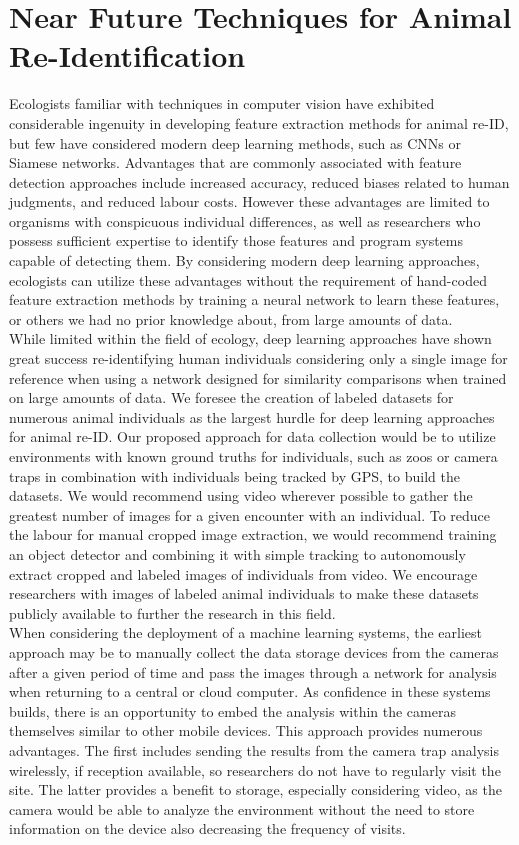 \documentclass[11pt]{article}
\begin{document}
\section*{Near Future Techniques for Animal Re-Identification}
Ecologists familiar with techniques in computer vision have exhibited considerable ingenuity in developing feature extraction methods for animal re-ID, but few have considered modern deep learning methods, such as CNNs or Siamese networks. Advantages that are commonly associated with feature detection approaches include increased accuracy, reduced biases related to human judgments, and reduced labour costs. However these advantages are limited to organisms with conspicuous individual differences, as well as researchers who possess sufficient expertise to identify those features and program systems capable of detecting them. By considering modern deep learning approaches, ecologists can utilize these advantages without the requirement of hand-coded feature extraction methods by training a neural network to learn these features, or others we had no prior knowledge about, from large amounts of data. 
\newline
\\
While limited within the field of ecology, deep learning approaches have shown great success re-identifying human individuals considering only a single image for reference when using a network designed for similarity comparisons when trained on large amounts of data. We foresee the creation of labeled datasets for numerous animal individuals as the largest hurdle for deep learning approaches for animal re-ID. Our proposed approach for data collection would be to utilize environments with known ground truths for individuals, such as zoos or camera traps in combination with individuals being tracked by GPS, to build the datasets. We would recommend using video wherever possible to gather the greatest number of images for a given encounter with an individual. To reduce the labour for manual cropped image extraction, we would recommend training an object detector and combining it with simple tracking to autonomously extract cropped and labeled images of individuals from video. We encourage researchers with images of labeled animal individuals to make these datasets publicly available to further the research in this field.
\newline
\\
When considering the deployment of a machine learning systems, the earliest approach may be to manually collect the data storage devices from the cameras after a given period of time and pass the images through a network for analysis when returning to a central or cloud computer. As confidence in these systems builds, there is an opportunity to embed the analysis within the cameras themselves similar to other mobile devices. This approach provides numerous advantages. The first includes sending the results from the camera trap analysis wirelessly, if reception available, so researchers do not have to regularly visit the site. The latter provides a benefit to storage, especially considering video, as the camera would be able to analyze the environment without the need to store information on the device also decreasing the frequency of visits. 
\end{document}
